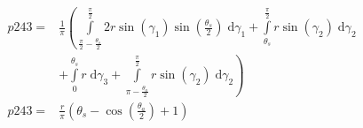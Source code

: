\begin{align}
    p243 =&\frac{1}{\pi} \left(\int\limits_{\frac{\pi}{2} - \frac{\theta_{s}}{2}}^{\frac{\pi}{2}}2 r \sin{\left (\gamma_{1} \right )} \sin{\left (\frac{\theta_{s}}{2} \right )}\;\mathrm{d}\gamma_{1}+\int\limits_{\theta_{s}}^{\frac{\pi}{2}}r \sin{\left (\gamma_{2} \right )}\;\mathrm{d}\gamma_{2}\right.\\
 &\left.+\int\limits_{0}^{\theta_{s}}r\;\mathrm{d}\gamma_{3}+\int\limits_{\pi - \frac{\theta_{a}}{2}}^{\frac{\pi}{2}}r \sin{\left (\gamma_{2} \right )}\;\mathrm{d}\gamma_{2}\right)\\
    p243 =& \frac{r}{\pi} \left(\theta_{s} - \cos{\left (\frac{\theta_{a}}{2} \right )} + 1\right)
\end{align}